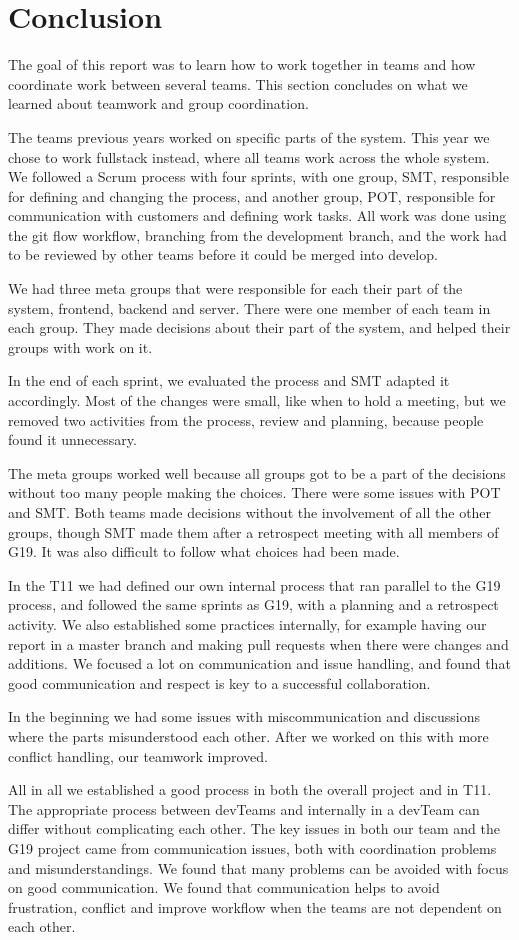 \section{Conclusion}
The goal of this report was to learn how to work together in teams and how coordinate work between several teams. This section concludes on what we learned about teamwork and group coordination. 

The teams previous years worked on specific parts of the system. This year we chose to work fullstack instead, where all teams work across the whole system. We followed a Scrum process with four sprints, with one group, \gls{SMT}, responsible for defining and changing the process, and another group, \gls{POT},  responsible for communication with customers and defining work tasks. All work was done using the git flow workflow, branching from the development branch, and the work had to be reviewed by other teams before it could be merged into develop. 

We had three meta groups that were responsible for each their part of the system, frontend, backend and server. There were one member of each team in each group. They made decisions about their part of the system, and helped their groups with work on it. 

In the end of each sprint, we evaluated the process and \gls{SMT} adapted it accordingly. Most of the changes were small, like when to hold a meeting, but we removed two activities from the process, review and planning, because people found it unnecessary. 

The meta groups worked well because all groups got to be a part of the decisions without too many people making the choices. There were some issues with \gls{POT} and \gls{SMT}. Both teams made decisions without the involvement of all the other groups, though \gls{SMT} made them after a retrospect meeting with all members of \gls{G19}. It was also difficult to follow what choices had been made.

In the \gls{T11} we had defined our own internal process that ran parallel to the \gls{G19} process, and followed the same sprints as \gls{G19}, with a planning and a retrospect activity. We also established some practices internally, for example having our report in a master branch and making pull requests when there were changes and additions.  We focused a lot on communication and issue handling, and found that good communication and respect is key to a successful collaboration. 

In the beginning we had some issues with miscommunication and discussions where the parts misunderstood each other. After we worked on this with more conflict handling, our teamwork improved. 

All in all we established a good process in both the overall project and in \gls{T11}. The appropriate process between \glspl{devTeam} and internally in a \gls{devTeam} can differ without complicating each other. The key issues in both our team and the \gls{G19} project came from communication issues, both with coordination problems and misunderstandings. We found that many problems can be avoided with focus on good communication. We found that communication helps to avoid frustration, conflict and improve workflow when the teams are not dependent on each other. 